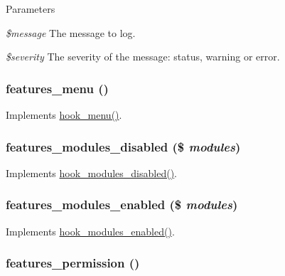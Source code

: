 \begin{DoxyParams}{Parameters}
\item[{\em \$message}]The message to log. \item[{\em \$severity}]The severity of the message: status, warning or error. \end{DoxyParams}
\hypertarget{features_8module_a2f3b3fc6d67373f91feb6e2e9d45c0f0}{
\subsubsection[{features\_\-menu}]{\setlength{\rightskip}{0pt plus 5cm}features\_\-menu ()}}
\label{features_8module_a2f3b3fc6d67373f91feb6e2e9d45c0f0}
Implements \hyperlink{group__hooks_ga5c95244fea59b25666e409759e133ded}{hook\_\-menu()}. \hypertarget{features_8module_ab4015ad6546e314fe3e6e8ed0d436c05}{
\subsubsection[{features\_\-modules\_\-disabled}]{\setlength{\rightskip}{0pt plus 5cm}features\_\-modules\_\-disabled (\$ {\em modules})}}
\label{features_8module_ab4015ad6546e314fe3e6e8ed0d436c05}
Implements \hyperlink{group__hooks_ga591c577fba8ca8dc8ec17f8bf80bdc4c}{hook\_\-modules\_\-disabled()}. \hypertarget{features_8module_a124f4a6b7d4a6678f703597bad15f6d7}{
\subsubsection[{features\_\-modules\_\-enabled}]{\setlength{\rightskip}{0pt plus 5cm}features\_\-modules\_\-enabled (\$ {\em modules})}}
\label{features_8module_a124f4a6b7d4a6678f703597bad15f6d7}
Implements \hyperlink{group__hooks_ga0eb7c67333e0f40b4a46c0dc4c4a92f3}{hook\_\-modules\_\-enabled()}. \hypertarget{features_8module_a8798acbb3fe11426ba45f33a83e055b6}{
\subsubsection[{features\_\-permission}]{\setlength{\rightskip}{0pt plus 5cm}features\_\-permission ()}}
